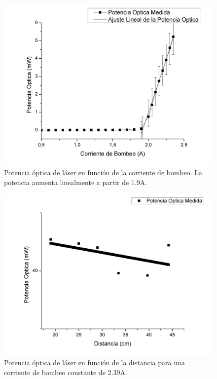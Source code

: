 \documentclass[10pt, a4paper]{article}%
\begin{document}
\begin{multicols}{2}
\begin{figure}[H]
    \centering
    \includegraphics[scale=0.3]{Graficos/potlaservscorr.png}
    \caption{Potencia óptica de láser en función de la corriente de bombeo. La potencia aumenta linealmente a partir de 1.9A.}
    \label{laservscorr}
\end{figure}

\begin{figure}[H]
    \centering
    \includegraphics[scale=0.3]{Graficos/potlaservsdist.png}
    \caption{Potencia óptica de láser en función de la distancia para una corriente de bombeo constante de 2.39A.}
    \label{laservsdist}
\end{figure}


\end{multicols}
\end{document}
